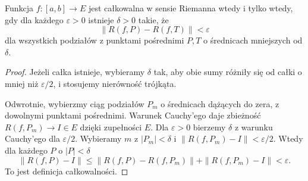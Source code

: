 \begin{lemat}
\label{ma2:lem:primitive-cauchy}
Funkcja $f:[a,b]\to E$ jest całkowalna w sensie
Riemanna wtedy i tylko wtedy, gdy dla każdego
$\varepsilon>0$ istnieje $\delta>0$ takie, że
\[
 \|R(f,P)-R(f,T)\|<\varepsilon
\]
dla wszystkich podziałów z punktami pośrednimi
$P,T$ o średnicach mniejszych od $\delta$.
\end{lemat}
\begin{proof}
Jeżeli całka istnieje, wybieramy $\delta$
tak, aby obie sumy różniły się od całki
o mniej niż $\varepsilon/2$, i stosujemy
nierówność trójkąta.

Odwrotnie, wybierzmy ciąg podziałów $P_m$
o średnicach dążących do zera, z dowolnymi
punktami pośrednimi. Warunek Cauchy'ego
daje zbieżność $R(f,P_m)\to I\in E$
dzięki zupełności $E$.
Dla $\varepsilon>0$ bierzemy $\delta$
z warunku Cauchy'ego dla $\varepsilon/2$.
Wybieramy $m$ z $|P_m|<\delta$ i
$\|R(f,P_m)-I\|<\varepsilon/2$.
Wtedy dla każdego $P$ o $|P|<\delta$
\[
 \|R(f,P)-I\|
 \le\|R(f,P)-R(f,P_m)\|+\|R(f,P_m)-I\|
 <\varepsilon.
\]
To jest definicja całkowalności.
\end{proof}

